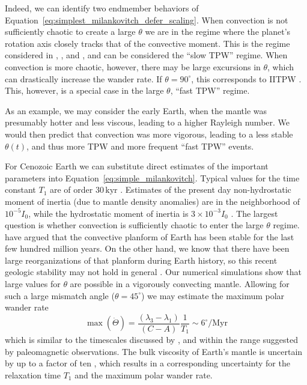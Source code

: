 \documentclass[extra,mreferee]{gji}
\begin{document}
Indeed, we can identify two endmember behaviors of Equation~\eqref{eq:simplest_milankovitch_defer_scaling}.
When convection is not sufficiently chaotic to create a large $\theta$ we are in the regime where the planet's rotation axis closely tracks that of the convective moment.
This is the regime considered in \citet{steinberger1997changes}, \citet{roberts2007cause}, and \citet{zhong2007supercontinent}, and can be considered the ``slow TPW'' regime.
When convection is more chaotic, however, there may be large excursions in $\theta$, which can drastically increase the wander rate.  
If $\theta=90^\circ$, this corresponds to IITPW \citep{kirschvink1997evidence}.  
This, however, is a special case in the large $\theta$, ``fast TPW'' regime.

As an example, we may consider the early Earth, when the mantle was presumably hotter and less viscous, leading to a 
higher Rayleigh number. We would then predict that convection was more vigorous, leading to 
a less stable $\theta(t)$, and thus more TPW and more frequent ``fast TPW'' events.

For Cenozoic Earth we can substitute direct estimates of the important parameters into Equation~\eqref{eq:simple_milankovitch}.
Typical values for the time constant $T_1$ are of order $30 \, \mathrm{kyr}$ \citep{ricard1993polar}.
Estimates of the present day non-hydrostatic moment of inertia (due to mantle density anomalies)
are in the neighborhood of $10^{-5} I_0$, while the hydrostatic moment of inertia is $3 \times 10^{-3} I_0$ \citep{chambat2001mean}.
The largest question is whether convection is sufficiently chaotic to enter the large $\theta$ regime. 
\citet{richards1997explanation} have argued that the convective planform of Earth has been stable for the last
few hundred million years. On the other hand, we know that there have been large reorganizations of that planform 
during Earth history, so this recent geologic stability may not hold in general \citep{evans2003true}.
Our numerical simulations show that large values for $\theta$ are possible in a vigorously convecting mantle.
Allowing for such a large mismatch angle ($\theta = 45^\circ$) we may estimate the maximum polar wander rate
\begin{equation}
\max ( \dot{\Theta} ) = \frac{(\lambda_3-\lambda_1)}{(C-A)}\frac{1}{T_1} \sim 6^\circ / \mathrm{Myr}
\end{equation}
which is similar to the timescales discussed by \citet{cambiotti2011new}, and within the range 
suggested by paleomagnetic observations.
The bulk viscosity of Earth's mantle is uncertain by up to a factor of ten \citep{mitrovica2004new},
which results in a corresponding uncertainty for the relaxation time $T_1$ and the maximum polar wander rate.
\end{document}
